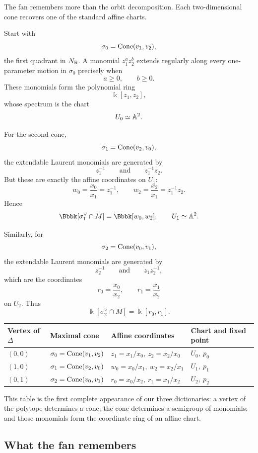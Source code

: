 The fan remembers more than the orbit decomposition. Each
two-dimensional cone recovers one of the standard affine charts.

Start with
\[
\sigma_0=\operatorname{Cone}(v_1,v_2),
\]
the first quadrant in \(N_{\mathbb{R}}\). A monomial \(z_1^az_2^b\) extends
regularly along every one-parameter motion in \(\sigma_0\) precisely
when
\[
a\geq0,\qquad b\geq0.
\]
These monomials form the polynomial ring
\[
\Bbbk[z_1,z_2],
\]
whose spectrum is the chart
\[
U_0\simeq\mathbb{A}^2.
\]

For the second cone,
\[
\sigma_1=\operatorname{Cone}(v_2,v_0),
\]
the extendable Laurent monomials are generated by
\[
z_1^{-1}
\qquad\text{and}\qquad
z_1^{-1}z_2.
\]
But these are exactly the affine coordinates on \(U_1\):
\[
w_0=\frac{x_0}{x_1}=z_1^{-1},
\qquad
w_2=\frac{x_2}{x_1}=z_1^{-1}z_2.
\]
Hence
\[
\Bbbk[\sigma_1^\vee\cap M]
=
\Bbbk[w_0,w_2],
\qquad
U_1\simeq\AAA^2.
\]

Similarly, for
\[
\sigma_2=\operatorname{Cone}(v_0,v_1),
\]
the extendable Laurent monomials are generated by
\[
z_2^{-1}
\qquad\text{and}\qquad
z_1z_2^{-1},
\]
which are the coordinates
\[
r_0=\frac{x_0}{x_2},
\qquad
r_1=\frac{x_1}{x_2}
\]
on \(U_2\). Thus
\[
\Bbbk[\sigma_2^\vee\cap M]
=
\Bbbk[r_0,r_1].
\]

\begin{center}
\small
\begin{tabularx}{\linewidth}{@{}
  >{\raggedright\arraybackslash}X
  >{\raggedright\arraybackslash}X
  >{\raggedright\arraybackslash}X
  >{\raggedright\arraybackslash}X@{}}
\toprule
\textbf{Vertex of \(\Delta\)}
&
\textbf{Maximal cone}
&
\textbf{Affine coordinates}
&
\textbf{Chart and fixed point}
\\
\midrule
\((0,0)\)
&
\(\sigma_0=\operatorname{Cone}(v_1,v_2)\)
&
\(z_1=x_1/x_0,\ z_2=x_2/x_0\)
&
\(U_0,\ p_0\)
\\[1mm]
\((1,0)\)
&
\(\sigma_1=\operatorname{Cone}(v_2,v_0)\)
&
\(w_0=x_0/x_1,\ w_2=x_2/x_1\)
&
\(U_1,\ p_1\)
\\[1mm]
\((0,1)\)
&
\(\sigma_2=\operatorname{Cone}(v_0,v_1)\)
&
\(r_0=x_0/x_2,\ r_1=x_1/x_2\)
&
\(U_2,\ p_2\)
\\
\bottomrule
\end{tabularx}
\end{center}

This table is the first complete appearance of our three dictionaries:
a vertex of the polytope determines a cone; the cone determines a
semigroup of monomials; and those monomials form the coordinate ring
of an affine chart.

\subsection{What the fan remembers}

